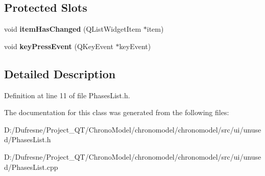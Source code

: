 \subsection*{Protected Slots}
\begin{DoxyCompactItemize}
\item 
\hypertarget{class_phases_list_a9e9af9684bfefecc1faca17d06a472fc}{void {\bfseries item\-Has\-Changed} (Q\-List\-Widget\-Item $\ast$item)}\label{class_phases_list_a9e9af9684bfefecc1faca17d06a472fc}

\item 
\hypertarget{class_phases_list_a72991fa72f7ea7c74022d5d1c60181f4}{void {\bfseries key\-Press\-Event} (Q\-Key\-Event $\ast$key\-Event)}\label{class_phases_list_a72991fa72f7ea7c74022d5d1c60181f4}

\end{DoxyCompactItemize}


\subsection{Detailed Description}


Definition at line 11 of file Phases\-List.\-h.



The documentation for this class was generated from the following files\-:\begin{DoxyCompactItemize}
\item 
D\-:/\-Dufresne/\-Project\-\_\-\-Q\-T/\-Chrono\-Model/chronomodel/chronomodel/src/ui/unused/Phases\-List.\-h\item 
D\-:/\-Dufresne/\-Project\-\_\-\-Q\-T/\-Chrono\-Model/chronomodel/chronomodel/src/ui/unused/Phases\-List.\-cpp\end{DoxyCompactItemize}
